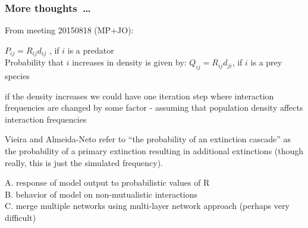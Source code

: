 \documentclass[12pt]{article}
\begin{document}
\subsubsection*{More thoughts~\ldots}

From meeting 20150818 (MP+JO):

$P_{ij} = R_{ij} d_{ij}$ , if $i$ is a predator\\

Probability that $i$ increases in density is given by:
$Q_{ij} = R_{ij} d_{ji}$, if $i$ is a prey species 

if the density increases we could have one iteration step where interaction frequencies are changed by some factor - assuming that population density affects interaction frequencies

Vieira and Almeida-Neto refer to ``the probability of an extinction cascade'' as the probability of a primary extinction resulting in additional extinctions (though really, this is just the simulated frequency).



A. response of model output to probabilistic values of R\\
B. behavior of model on non-mutualistic interactions\\
C. merge multiple networks using multi-layer network approach (perhaps very difficult)



\end{document}
